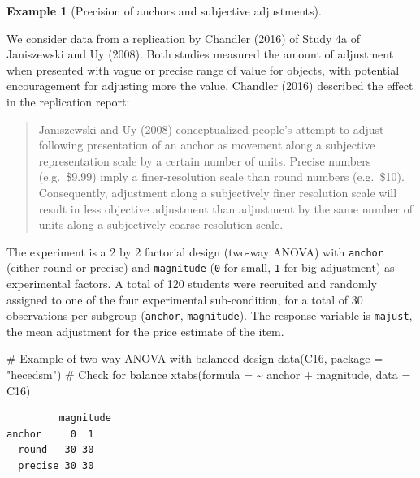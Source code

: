 \documentclass[
  11pt,
  letterpaper,
]{scrbook}
\newenvironment{Shaded}{\begin{snugshade}}{\end{snugshade}}
\newcommand{\AttributeTok}[1]{\textcolor[rgb]{0.40,0.45,0.13}{#1}}
\newcommand{\CommentTok}[1]{\textcolor[rgb]{0.37,0.37,0.37}{#1}}
\newcommand{\FunctionTok}[1]{\textcolor[rgb]{0.28,0.35,0.67}{#1}}
\newcommand{\NormalTok}[1]{\textcolor[rgb]{0.00,0.23,0.31}{#1}}
\newcommand{\SpecialCharTok}[1]{\textcolor[rgb]{0.37,0.37,0.37}{#1}}
\newcommand{\StringTok}[1]{\textcolor[rgb]{0.13,0.47,0.30}{#1}}
\theoremstyle{definition}
\theoremstyle{definition}
\newtheorem{example}{Example}[chapter]
\theoremstyle{remark}
\begin{document}
\begin{example}[Precision of anchors and subjective
adjustments]\protect\hypertarget{exm-anchor}{}\label{exm-anchor}

We consider data from a replication by Chandler (2016) of Study 4a of
Janiszewski and Uy (2008). Both studies measured the amount of
adjustment when presented with vague or precise range of value for
objects, with potential encouragement for adjusting more the value.
Chandler (2016) described the effect in the replication report:

\begin{quote}
Janiszewski and Uy (2008) conceptualized people's attempt to adjust
following presentation of an anchor as movement along a subjective
representation scale by a certain number of units. Precise numbers
(e.g.~\$9.99) imply a finer-resolution scale than round numbers
(e.g.~\$10). Consequently, adjustment along a subjectively finer
resolution scale will result in less objective adjustment than
adjustment by the same number of units along a subjectively coarse
resolution scale.
\end{quote}

The experiment is a 2 by 2 factorial design (two-way ANOVA) with
\texttt{anchor} (either round or precise) and \texttt{magnitude}
(\texttt{0} for small, \texttt{1} for big adjustment) as experimental
factors. A total of 120 students were recruited and randomly assigned to
one of the four experimental sub-condition, for a total of 30
observations per subgroup (\texttt{anchor}, \texttt{magnitude}). The
response variable is \texttt{majust}, the mean adjustment for the price
estimate of the item.

\begin{Shaded}
\begin{Highlighting}[]
\CommentTok{\# Example of two{-}way ANOVA with balanced design}
\FunctionTok{data}\NormalTok{(C16, }\AttributeTok{package =} \StringTok{"hecedsm"}\NormalTok{)}
\CommentTok{\# Check for balance}
\FunctionTok{xtabs}\NormalTok{(}\AttributeTok{formula =} \SpecialCharTok{\textasciitilde{}}\NormalTok{ anchor }\SpecialCharTok{+}\NormalTok{ magnitude,}
      \AttributeTok{data =}\NormalTok{ C16)}
\end{Highlighting}
\end{Shaded}

\begin{verbatim}
         magnitude
anchor     0  1
  round   30 30
  precise 30 30
\end{verbatim}


\end{example}
\end{document}
